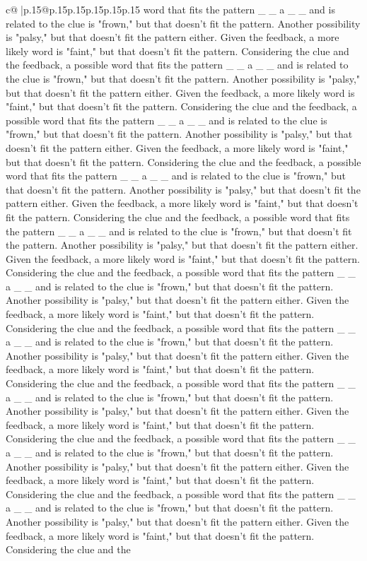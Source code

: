 \documentclass{article}
\begin{document}
{\begin{supertabular}{c@{$\;$}|p{.15\linewidth}@{}p{.15\linewidth}p{.15\linewidth}p{.15\linewidth}p{.15\linewidth}p{.15\linewidth}}
{{{word that fits the pattern \_ \_ a \_ \_ and is related to the clue is "frown," but that doesn't fit the pattern. Another possibility is "palsy," but that doesn't fit the pattern either. Given the feedback, a more likely word is "faint," but that doesn't fit the pattern. Considering the clue and the feedback, a possible word that fits the pattern \_ \_ a \_ \_ and is related to the clue is "frown," but that doesn't fit the pattern. Another possibility is "palsy," but that doesn't fit the pattern either. Given the feedback, a more likely word is "faint," but that doesn't fit the pattern. Considering the clue and the feedback, a possible word that fits the pattern \_ \_ a \_ \_ and is related to the clue is "frown," but that doesn't fit the pattern. Another possibility is "palsy," but that doesn't fit the pattern either. Given the feedback, a more likely word is "faint," but that doesn't fit the pattern. Considering the clue and the feedback, a possible word that fits the pattern \_ \_ a \_ \_ and is related to the clue is "frown," but that doesn't fit the pattern. Another possibility is "palsy," but that doesn't fit the pattern either. Given the feedback, a more likely word is "faint," but that doesn't fit the pattern. Considering the clue and the feedback, a possible word that fits the pattern \_ \_ a \_ \_ and is related to the clue is "frown," but that doesn't fit the pattern. Another possibility is "palsy," but that doesn't fit the pattern either. Given the feedback, a more likely word is "faint," but that doesn't fit the pattern. Considering the clue and the feedback, a possible word that fits the pattern \_ \_ a \_ \_ and is related to the clue is "frown," but that doesn't fit the pattern. Another possibility is "palsy," but that doesn't fit the pattern either. Given the feedback, a more likely word is "faint," but that doesn't fit the pattern. Considering the clue and the feedback, a possible word that fits the pattern \_ \_ a \_ \_ and is related to the clue is "frown," but that doesn't fit the pattern. Another possibility is "palsy," but that doesn't fit the pattern either. Given the feedback, a more likely word is "faint," but that doesn't fit the pattern. Considering the clue and the feedback, a possible word that fits the pattern \_ \_ a \_ \_ and is related to the clue is "frown," but that doesn't fit the pattern. Another possibility is "palsy," but that doesn't fit the pattern either. Given the feedback, a more likely word is "faint," but that doesn't fit the pattern. Considering the clue and the feedback, a possible word that fits the pattern \_ \_ a \_ \_ and is related to the clue is "frown," but that doesn't fit the pattern. Another possibility is "palsy," but that doesn't fit the pattern either. Given the feedback, a more likely word is "faint," but that doesn't fit the pattern. Considering the clue and the feedback, a possible word that fits the pattern \_ \_ a \_ \_ and is related to the clue is "frown," but that doesn't fit the pattern. Another possibility is "palsy," but that doesn't fit the pattern either. Given the feedback, a more likely word is "faint," but that doesn't fit the pattern. Considering the clue and the }}}
\end{supertabular}}
\end{document}
